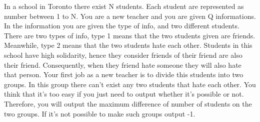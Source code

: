 In a school in Toronto there exist N students. Each student are represented as number between 1 to N.
You are a new teacher and you are given Q informations. In the information you are given the type of info, and two different students.
There are two types of info, type 1 means that the two students given are friends. Meanwhile, type 2 means that the two students hate each other.
Students in this school have high solidarity, hence they consider friends of their friend are also their friend.
Consequently, when they friend hate someone they will also hate that person. Your first job as a new teacher is to divide this students into two groups.
In this group there can't exist any two students that hate each other. You think that it's too easy if you just need to output whether it's possible or not.
Therefore, you will output the maximum difference of number of students on the two groups. If it's not possible to make such groups output -1.
